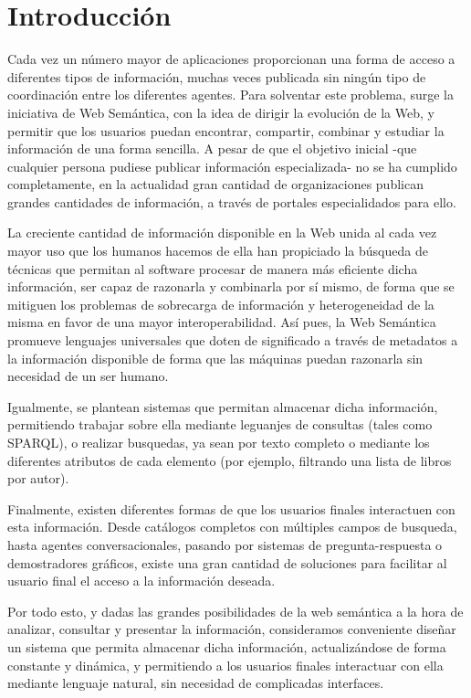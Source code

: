 \documentclass[a4paper,11pt]{report}
\begin{document}
\chapter*{Introducción}

Cada vez un número mayor de aplicaciones proporcionan una forma de acceso a diferentes tipos de información, muchas veces publicada sin ningún tipo de coordinación entre los diferentes agentes. Para solventar este problema, surge la iniciativa de Web Semántica, con la idea de dirigir la evolución de la Web, y permitir que los usuarios puedan encontrar, compartir, combinar y estudiar la información de una forma sencilla. A pesar de que el objetivo inicial -que cualquier persona pudiese publicar información especializada- no se ha cumplido completamente, en la actualidad gran cantidad de organizaciones publican grandes cantidades de información, a través de portales especialidados para ello.

La creciente cantidad de información disponible en la Web unida al cada vez mayor uso que los humanos hacemos de ella han propiciado la búsqueda de técnicas que permitan al software procesar de manera más eficiente dicha información, ser capaz de razonarla y combinarla por sí mismo, de forma que se mitiguen los problemas de sobrecarga de información y heterogeneidad de la misma en favor de una mayor interoperabilidad. Así pues, la Web Semántica promueve lenguajes universales que doten de significado a través de metadatos a la información disponible de forma que las máquinas puedan razonarla sin necesidad de un ser humano.

Igualmente, se plantean sistemas que permitan almacenar dicha información, permitiendo trabajar sobre ella mediante leguanjes de consultas (tales como SPARQL), o realizar busquedas, ya sean por texto completo o mediante los diferentes atributos de cada elemento (por ejemplo, filtrando una lista de libros por autor).

Finalmente, existen diferentes formas de que los usuarios finales interactuen con esta información. Desde catálogos completos con múltiples campos de busqueda, hasta agentes conversacionales, pasando por sistemas de pregunta-respuesta o demostradores gráficos, existe una gran cantidad de soluciones para facilitar al usuario final el acceso a la información deseada.

Por todo esto, y dadas las grandes posibilidades de la web semántica a la hora de analizar, consultar y presentar la información, consideramos conveniente diseñar un sistema que permita almacenar dicha información, actualizándose de forma constante y dinámica, y permitiendo a los usuarios finales interactuar con ella mediante lenguaje natural, sin necesidad de complicadas interfaces.
\end{document}
